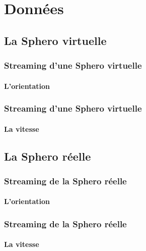 \section{Données}
\subsection{La Sphero virtuelle}

\begin{frame}
 \frametitle{Streaming d'une Sphero virtuelle}
 \framesubtitle{L'orientation}
 
\end{frame}

\begin{frame}
 \frametitle{Streaming d'une Sphero virtuelle}
 \framesubtitle{La vitesse}
 
\end{frame}

\subsection{La Sphero réelle}

\begin{frame}
 \frametitle{Streaming de la Sphero réelle}
 \framesubtitle{L'orientation}
 
\end{frame}

\begin{frame}
 \frametitle{Streaming de la Sphero réelle}
 \framesubtitle{La vitesse}
 
\end{frame}